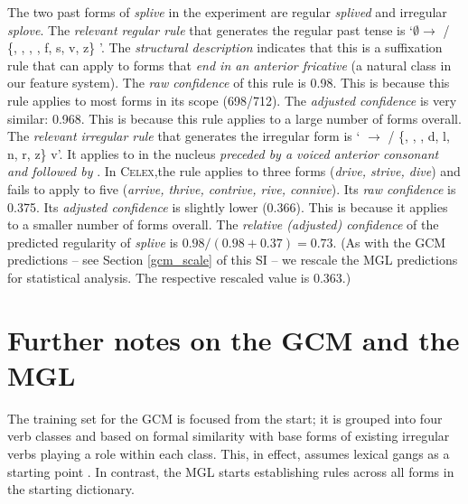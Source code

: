\documentclass[12pt]{article}
\begin{document}
The two past forms of {\em splive} in the experiment are regular {\em splived} and irregular {\em splove}. The {\em relevant regular rule} that generates the regular past tense is `$\emptyset{} \rightarrow{}$ \textipa{[d]} / \{, , , , f, s, v, z\} \underline{\hspace{0.5cm}}'. The {\em structural description} indicates that this is a suffixation rule that can apply to forms that {\em end in an anterior fricative} (a natural class in our feature system).  The {\em raw confidence} of this rule is 0.98. This is because this rule applies to most forms in its scope (698/712). The {\em adjusted confidence} is very similar: 0.968. This is because this rule applies to a large number of forms overall. The {\em relevant irregular rule} that generates the irregular form is `\textipa{[aI]} $\rightarrow{}$ \textipa{[oU]} / \{, , , d, l, n, r, z\} \underline{\hspace{0.5cm}}v'. It applies to \textipa{[aI]} in the nucleus {\em preceded by a voiced anterior consonant and followed by \textipa{[v]}}. In \textsc{Celex},the rule applies to three forms ({\em drive, strive, dive}) and fails to apply to five ({\em arrive, thrive, contrive, rive, connive}). Its {\em raw confidence} is 0.375. Its {\em adjusted confidence} is slightly lower (0.366). This is because it applies to a smaller number of forms overall. The {\em relative (adjusted) confidence} of the predicted regularity of {\em splive} is $0.98/(0.98+0.37)=0.73$. (As with the GCM predictions -- see Section \ref{gcm_scale} of this SI -- we rescale the MGL predictions for statistical analysis. The respective rescaled value is 0.363.)

\section{Further notes on the GCM and the MGL \label{appendixgcmvsmgl}}

The training set for the GCM is focused from the start; it is grouped into four verb classes and based on formal similarity with base forms of existing irregular verbs playing a role within each class. This, in effect, assumes lexical gangs as a starting point \citep{alegre1999rule}. In contrast, the MGL starts establishing rules across all forms in the starting dictionary.
\end{document}
